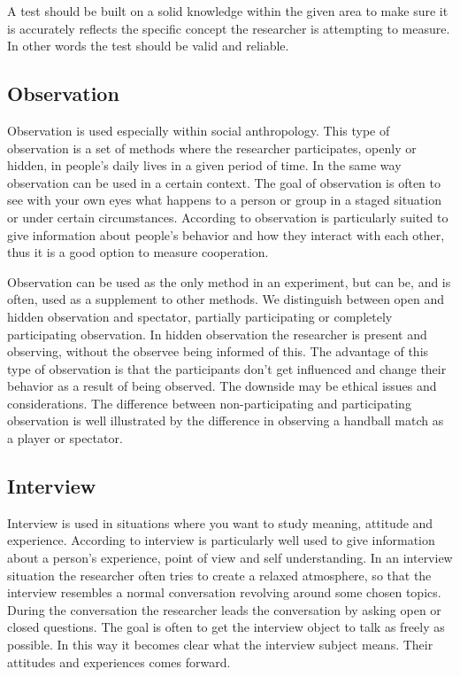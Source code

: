 \bigskip\noindent
A test should be built on a solid knowledge within the given area to make sure it is accurately reflects the specific concept the researcher is attempting to measure. In other words the test should be valid and reliable. 

\subsection*{Observation}
Observation is used especially within social anthropology. This type of observation is a set of methods where the researcher participates, openly or hidden, in people's daily lives in a given period of time\cite{tjora2012kvalitative}. In the same way observation can be used in a certain context. The goal of observation is often to see with your own eyes what happens to a person or group in a staged situation or under certain circumstances. According to  observation is particularly suited to give information about people's behavior and how they interact with each other, thus it is a good option to measure cooperation. 

\bigskip\noindent
Observation can be used as the only method in an experiment, but can be, and is often, used as a supplement to other methods. We distinguish between open and hidden observation and spectator, partially participating or completely participating observation. In hidden observation the researcher is present and observing, without the observee being informed of this. The advantage of this type of observation is that the participants don't get influenced and change their behavior as a result of being observed. The downside may be ethical issues and considerations. The difference between non-participating and participating observation is well illustrated by the difference in observing a handball match as a player or spectator. 

\subsection*{Interview}
Interview is used in situations where you want to study meaning, attitude and experience\cite{tjora2012kvalitative}. According to  interview is particularly well used to give information about a person's experience, point of view and self understanding. In an interview situation the researcher often tries to create a relaxed atmosphere, so that the interview resembles a normal conversation revolving around some chosen topics. During the conversation the researcher leads the conversation by asking open or closed questions. The goal is often to get the interview object to talk as freely as possible. In this way it becomes clear what the interview subject means. Their attitudes and experiences comes forward. 

